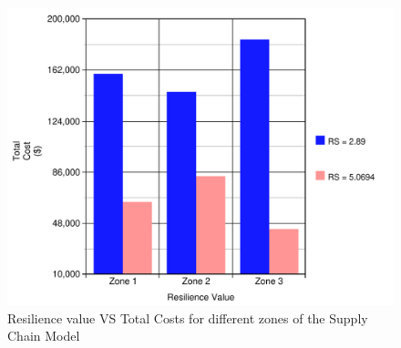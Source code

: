 \begin{figure}[H]
  \centering
  \includegraphics[width=6.5in]{figures/pdf/RVC.pdf}
  \caption{Resilience value VS Total Costs for different zones of the Supply Chain Model}\label{G2}
\end{figure}  


